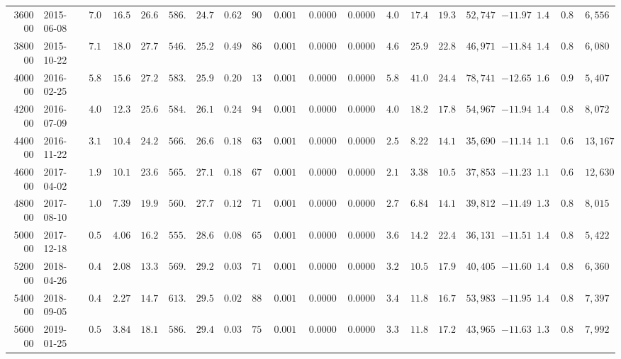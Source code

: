 \begin{tabular}{rlllllllllllllllllll}
\toprule
\midrule
360000 & 2015-06-08 & $7.01$ & $16.51$ & $26.61$ & $586.1$ & $24.71$ & $0.620$ & $90$ & $0.00171$ & $0.000019$ & $0.000054$ & $4.01$ & $17.42$ & $19.34$ & $52,747$ & $-11.97$ & $1.48$ & $0.88$ & $6,556$ \\
380000 & 2015-10-22 & $7.11$ & $18.03$ & $27.73$ & $546.2$ & $25.24$ & $0.495$ & $86$ & $0.00183$ & $0.000021$ & $0.000059$ & $4.63$ & $25.98$ & $22.88$ & $46,971$ & $-11.84$ & $1.47$ & $0.87$ & $6,080$ \\
400000 & 2016-02-25 & $5.87$ & $15.68$ & $27.24$ & $583.3$ & $25.93$ & $0.200$ & $135$ & $0.00171$ & $0.000013$ & $0.000048$ & $5.88$ & $41.04$ & $24.44$ & $78,741$ & $-12.65$ & $1.66$ & $0.93$ & $5,407$ \\
420000 & 2016-07-09 & $4.09$ & $12.33$ & $25.67$ & $584.8$ & $26.17$ & $0.240$ & $94$ & $0.00171$ & $0.000018$ & $0.000047$ & $4.06$ & $18.28$ & $17.80$ & $54,967$ & $-11.94$ & $1.43$ & $0.85$ & $8,072$ \\
440000 & 2016-11-22 & $3.11$ & $10.49$ & $24.24$ & $566.5$ & $26.64$ & $0.185$ & $63$ & $0.00177$ & $0.000028$ & $0.000046$ & $2.59$ & $8.22$ & $14.12$ & $35,690$ & $-11.14$ & $1.15$ & $0.63$ & $13,167$ \\
460000 & 2017-04-02 & $1.96$ & $10.13$ & $23.63$ & $565.0$ & $27.19$ & $0.185$ & $67$ & $0.00177$ & $0.000026$ & $0.000046$ & $2.10$ & $3.38$ & $10.53$ & $37,853$ & $-11.23$ & $1.18$ & $0.67$ & $12,630$ \\
480000 & 2017-08-10 & $1.09$ & $7.39$ & $19.98$ & $560.7$ & $27.79$ & $0.125$ & $71$ & $0.00178$ & $0.000025$ & $0.000056$ & $2.74$ & $6.84$ & $14.16$ & $39,812$ & $-11.49$ & $1.34$ & $0.80$ & $8,015$ \\
500000 & 2017-12-18 & $0.54$ & $4.06$ & $16.25$ & $555.9$ & $28.65$ & $0.085$ & $65$ & $0.00180$ & $0.000028$ & $0.000071$ & $3.65$ & $14.27$ & $22.42$ & $36,131$ & $-11.51$ & $1.43$ & $0.85$ & $5,422$ \\
520000 & 2018-04-26 & $0.41$ & $2.08$ & $13.33$ & $569.1$ & $29.26$ & $0.035$ & $71$ & $0.00176$ & $0.000025$ & $0.000062$ & $3.26$ & $10.59$ & $17.90$ & $40,405$ & $-11.60$ & $1.41$ & $0.84$ & $6,360$ \\
540000 & 2018-09-05 & $0.47$ & $2.27$ & $14.77$ & $613.4$ & $29.50$ & $0.025$ & $88$ & $0.00163$ & $0.000019$ & $0.000050$ & $3.45$ & $11.86$ & $16.75$ & $53,983$ & $-11.95$ & $1.45$ & $0.86$ & $7,397$ \\
560000 & 2019-01-25 & $0.57$ & $3.84$ & $18.10$ & $586.2$ & $29.48$ & $0.030$ & $75$ & $0.00171$ & $0.000023$ & $0.000053$ & $3.37$ & $11.86$ & $17.21$ & $43,965$ & $-11.63$ & $1.37$ & $0.82$ & $7,992$ \\

\end{tabular}
